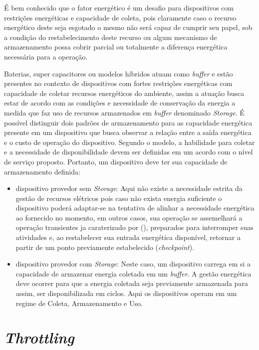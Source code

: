 É bem conhecido que o fator energético é um desafio para dispositivos com restrições energéticas e capacidade de coleta, pois claramente caso o recurso energético deste seja esgotado o mesmo não será capaz de cumprir seu papel, sob a condição do restabelecimento deste recurso ou algum mecanismo de armazenamento possa cobrir parcial ou totalmente a diferença energética necessária para a operação.

Baterias, super capacitores ou modelos híbridos atuam como \textit{buffer} e estão presentes no contexto de dispositivos com fortes restrições energéticas com capacidade de coletar recursos energéticos do ambiente, assim a atuação busca estar de acordo com as condições e necessidade de conservação da energia a medida que faz uso de recursos armazenados em \textit{buffer} denominado \textit{Storage}. É possível distinguir dois padrões de armazenamento para as capacidade energética presente em um dispositivo que busca observar a relação entre a saída energética e o custo de operação do dispositivo. Segundo o modelo, a habilidade para coletar e a necessidade de disponibilidade devem ser definidas em um acordo com o nível de serviço proposto. Portanto, um dispositivo deve ter sua capacidade de armazenamento definida:

\begin{itemize}
    \item dispositivo provedor sem \textit{Storage}: Aqui não existe a necessidade estrita da gestão de recursos elétricos pois caso não exista energia suficiente o dispositivo poderá adaptar-se na tentativa de alinhar a necessidade energética ao fornecido no momento, em outros casos, sua operação se assemelhará a operação transientes ja caraterizado por  \citeauthor{sliper_energy-driven_2020} (\citeyear{sliper_energy-driven_2020}), preparados para interromper suas atividades e, ao restabelecer sua entrada energética disponível, retornar a partir de um ponto previamente estabelecido (\textit{checkpoint}). 
    
    \item dispositivo provedor com \textit{Storage}: Neste caso, um dispositivo carrega em si a capacidade de armazenar energia coletada em um \textit{buffer}. A gestão energética deve ocorrer para que a energia coletada seja previamente armazenada para assim, ser disponibilizada em ciclos. Aqui os dispositivos operam em um regime de Coleta, Armazenamento e Uso.
\end{itemize}

\section{\textit{Throttling}}

